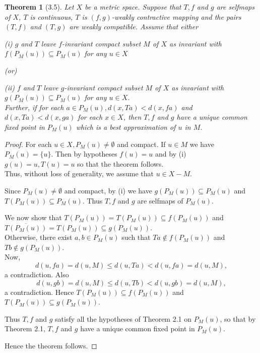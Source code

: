 \documentclass[11]{article}
\newtheorem{theorem}[definition]{Theorem}
\numberwithin{equation}{definition}
\begin{document}
\begin{theorem}[3.5]
Let \(X\) be a metric space. Suppose that \(T, f\) and \(g\) are selfmaps of \(X\), \(T\) is continuous, \(T\) is \((f,g)\)-weakly contractive mapping and the pairs \((T,f)\) and \((T,g)\) are weakly compatible. Assume that either

(i) \(g\) and \(T\) leave \(f\)-invariant compact subset \(M\) of \(X\) as invariant with \(f(P_{M}(u))\subseteq P_{M}(u)\) for any \(u\in X\)

(or)

(ii) \(f\) and \(T\) leave \(g\)-invariant compact subset \(M\) of \(X\) as invariant with \(g(P_{M}(u))\subseteq P_{M}(u)\) for any \(u\in X\). \\
Further, if for each \(a\in P_{M}(u), d(x,Ta) < d(x,fa)\) and \(d(x,Ta) < d(x,ga)\) for each \(x\in X\), then \(T,f\) and \(g\) have a unique common fixed point in \(P_{M}(u)\) which is a best approximation of \(u\) in \(M\).
\end{theorem}

\begin{proof}
For each \(u\in X, P_{M}(u)\neq\emptyset\) and compact. If \(u\in M\) we have \(P_{M}(u)=\{u\}\). Then by hypotheses \(f(u)=u\) and by (i) \(g(u)=u, T(u)=u\) so that the theorem follows.\\
Thus, without loss of generality, we assume that \(u\in X-M\).

Since \(P_{M}(u)\neq\emptyset\) and compact, by (i) we have \(g(P_{M}(u))\subseteq P_{M}(u)\) and \(T(P_{M}(u))\subseteq P_{M}(u)\). Thus \(T,f\) and \(g\) are selfmaps of \(P_{M}(u)\).

We now show that \(T(P_{M}(u)) = T(P_{M}(u)) \subseteq f(P_{M}(u))\) and \(\overline{T(P_{M}(u))} = T(P_{M}(u)) \subseteq g(P_{M}(u))\).\\
Otherwise, there exist \(a,b\in P_{M}(u)\) such that \(Ta\notin f(P_{M}(u))\) and \(Tb\notin g(P_{M}(u))\).\\
Now,
\[
d(u,fa) = d(u,M) \leq d(u,Ta) < d(u,fa) = d(u,M),
\]
a contradiction. Also
\[
d(u,gb) = d(u,M) \leq d(u,Tb) < d(u,gb) = d(u,M),
\]
a contradiction.
Hence \(T(P_{M}(u))\subseteq f(P_{M}(u))\) and \(T(P_{M}(u))\subseteq g(P_{M}(u))\).

Thus \(T, f\) and \(g\) satisfy all the hypotheses of Theorem 2.1 on \(P_{M}(u)\), so that by Theorem 2.1, \(T,f\) and \(g\) have a unique common fixed point in \(P_{M}(u)\).

Hence the theorem follows.
\end{proof}
\end{document}
